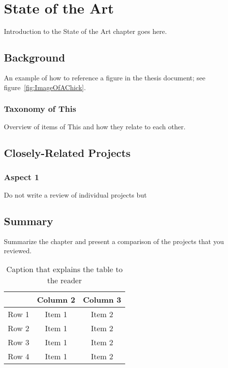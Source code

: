 \chapter{State of the Art}

Introduction to the State of the Art chapter goes here.


\section{Background}

An example of how to reference a figure in the thesis document; see figure~\ref{fig:ImageOfAChick}.


\subsection{Taxonomy of This}

Overview of items of This and how they relate to each other.

\section{Closely-Related Projects}

\subsection{Aspect 1}

Do not write a review of individual projects but 

\section{Summary}

Summarize the chapter and present a comparison of the projects that you reviewed.

\begin{table}[!h]
\begin{center}
	\begin{tabular}{|l|c|c|} 
	\hline
 	\bf  & \bf Column 2  & \bf Column 3 \\
  	\hline
	Row 1 & Item 1 & Item 2 \\
	Row 2 & Item 1 & Item 2 \\
	Row 3 & Item 1 & Item 2 \\
	Row 4 & Item 1 & Item 2 \\
	\hline
	\end{tabular}
\end{center}
\caption[Comparison of Closely-Related Projects]{Caption that explains the table to the reader}	
\label{tab:SummaryProjects}
\end{table}
